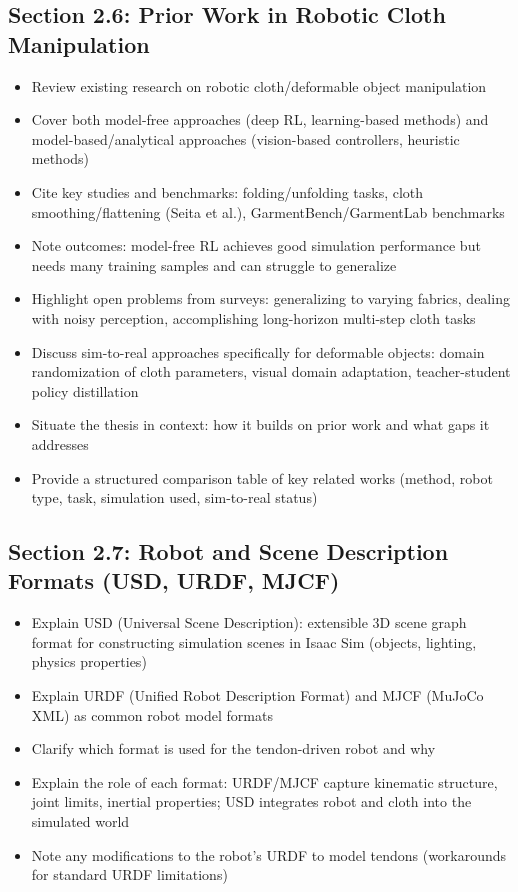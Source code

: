 \subsection{Section 2.6: Prior Work in Robotic Cloth Manipulation}
\begin{itemize}
    \item Review existing research on robotic cloth/deformable object manipulation
    \item Cover both model-free approaches (deep RL, learning-based methods) and model-based/analytical approaches (vision-based controllers, heuristic methods)
    \item Cite key studies and benchmarks: folding/unfolding tasks, cloth smoothing/flattening (Seita et al.), GarmentBench/GarmentLab benchmarks
    \item Note outcomes: model-free RL achieves good simulation performance but needs many training samples and can struggle to generalize
    \item Highlight open problems from surveys: generalizing to varying fabrics, dealing with noisy perception, accomplishing long-horizon multi-step cloth tasks
    \item Discuss sim-to-real approaches specifically for deformable objects: domain randomization of cloth parameters, visual domain adaptation, teacher-student policy distillation
    \item Situate the thesis in context: how it builds on prior work and what gaps it addresses
    \item Provide a structured comparison table of key related works (method, robot type, task, simulation used, sim-to-real status)
\end{itemize}

\subsection{Section 2.7: Robot and Scene Description Formats (USD, URDF, MJCF)}
\begin{itemize}
    \item Explain USD (Universal Scene Description): extensible 3D scene graph format for constructing simulation scenes in Isaac Sim (objects, lighting, physics properties)
    \item Explain URDF (Unified Robot Description Format) and MJCF (MuJoCo XML) as common robot model formats
    \item Clarify which format is used for the tendon-driven robot and why
    \item Explain the role of each format: URDF/MJCF capture kinematic structure, joint limits, inertial properties; USD integrates robot and cloth into the simulated world
    \item Note any modifications to the robot's URDF to model tendons (workarounds for standard URDF limitations)
\end{itemize}

